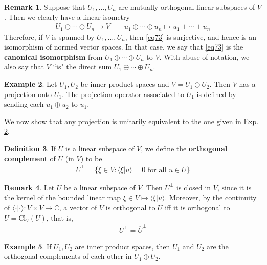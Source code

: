\documentclass[12pt,b5paper,notitlepage]{article}
\theoremstyle{definition}
\newtheorem{df}{Definition}[section]
\newtheorem{eg}[df]{Example}
\newtheorem{rem}[df]{Remark}
\theoremstyle{plain}
\newcommand{\ovl}{\overline}
\newcommand{\bk}[1]{\langle {#1}\rangle}
\newcommand{\Cbb}{\mathbb C}
\newcommand{\Cl}{\mathrm{Cl}}
\numberwithin{equation}{section}
\begin{document}
\begin{rem}
Suppose that $U_1,\dots,U_n$ are mutually orthogonal linear subspaces of $V$. Then we clearly have a linear isometry
\begin{gather}\label{eq73}
U_1\oplus\cdots\oplus U_n\longrightarrow V\qquad u_1\oplus\cdots\oplus u_n\mapsto u_1+\cdots+u_n
\end{gather}
Therefore, if $V$ is spanned by $U_1,\dots,U_n$, then \eqref{eq73} is surjective, and hence is an isomorphism of normed vector spaces. In that case, we say that \eqref{eq73} is the \textbf{canonical isomorphism} from $U_1\oplus\cdots\oplus U_n$ to $V$. With abuse of notation, we also say that $V$ ``is" the direct sum $U_1\oplus\cdots\oplus U_n$. 
\end{rem}


\begin{eg}\label{lb145}
Let $U_1,U_2$ be inner product spaces and $V=U_1\oplus U_2$. Then $V$ has a projection onto $U_1$. The projection operator associated to $U_1$ is defined by sending each $u_1\oplus u_2$ to $u_1$.
\end{eg}


We now show that any projection is unitarily equivalent to the one given in Exp. \ref{lb145}.

\begin{df}
If $U$ is a linear subspace of $V$, we define the \textbf{orthogonal complement}  of $U$ (in $V$) to be
\begin{align*}
U^\perp=\{\xi\in V:\bk{\xi|u}=0\text{ for all }u\in U\}
\end{align*}
\end{df}

\begin{rem}\label{lb150}
Let $U$ be a linear subspace of $V$. Then $U^\perp$ is closed in $V$, since it is the kernel of the bounded linear map $\xi\in V\mapsto\bk{\xi|u}$. Moreover, by the continuity of $\bk{\cdot|\cdot}:V\times V\rightarrow\Cbb$, a vector of $V$ is orthogonal to $U$ iff it is orthogonal to $\ovl U=\Cl_V(U)$, that is,
\begin{align*}
U^\perp=\ovl U^\perp
\end{align*}
\end{rem}



\begin{eg}
If $U_1,U_2$ are inner product spaces, then $U_1$ and $U_2$ are the orthogonal complements of each other in $U_1\oplus U_2$. 
\end{eg}
\end{document}
